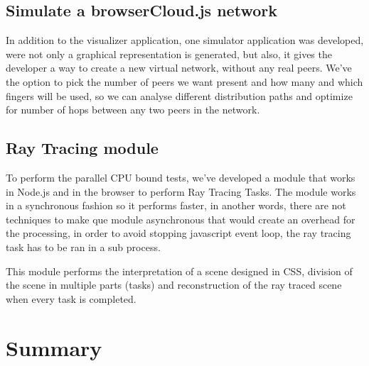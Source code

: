 \subsection{Simulate a browserCloud.js network}

In addition to the visualizer application, one simulator application was developed, were not only a graphical representation is generated, but also, it gives the developer a way to create a new virtual network, without any real peers. We've the option to pick the number of peers we want present and how many and which fingers will be used, so we can analyse different distribution paths and optimize for number of hops between any two peers in the network.

\subsection{Ray Tracing module}

To perform the parallel CPU bound tests, we've developed a module that works in Node.js and in the browser to perform Ray Tracing Tasks. The module works in a synchronous fashion so it performs faster, in another words, there are not techniques to make que module asynchronous that would create an overhead for the processing, in order to avoid stopping javascript event loop, the ray tracing task has to be ran in a sub process.

This module performs the interpretation of a scene designed in CSS, division of the scene in multiple parts (tasks) and reconstruction of the ray traced scene when every task is completed.

\section{Summary}


